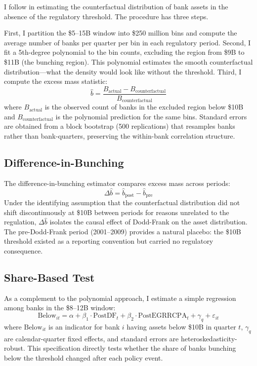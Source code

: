 \documentclass[12pt]{article}
\begin{document}
I follow \citet{Kleven2013} in estimating the counterfactual distribution of bank assets in the absence of the regulatory threshold. The procedure has three steps.

First, I partition the \$5--15B window into \$250 million bins and compute the average number of banks per quarter per bin in each regulatory period. Second, I fit a 5th-degree polynomial to the bin counts, excluding the region from \$9B to \$11B (the bunching region). This polynomial estimates the smooth counterfactual distribution---what the density would look like without the threshold. Third, I compute the excess mass statistic:
\begin{equation}
\hat{b} = \frac{B_{\text{actual}} - B_{\text{counterfactual}}}{B_{\text{counterfactual}}}
\label{eq:bunching}
\end{equation}
where $B_{\text{actual}}$ is the observed count of banks in the excluded region below \$10B and $B_{\text{counterfactual}}$ is the polynomial prediction for the same bins. Standard errors are obtained from a block bootstrap (500 replications) that resamples banks rather than bank-quarters, preserving the within-bank correlation structure.

\subsection{Difference-in-Bunching}

The difference-in-bunching estimator compares excess mass across periods:
\begin{equation}
\Delta \hat{b} = \hat{b}_{\text{post}} - \hat{b}_{\text{pre}}
\end{equation}
Under the identifying assumption that the counterfactual distribution did not shift discontinuously at \$10B between periods for reasons unrelated to the regulation, $\Delta \hat{b}$ isolates the causal effect of Dodd-Frank on the asset distribution. The pre-Dodd-Frank period (2001--2009) provides a natural placebo: the \$10B threshold existed as a reporting convention but carried no regulatory consequence.

\subsection{Share-Based Test}

As a complement to the polynomial approach, I estimate a simple regression among banks in the \$8--12B window:
\begin{equation}
\text{Below}_{it} = \alpha + \beta_1 \cdot \text{PostDF}_t + \beta_2 \cdot \text{PostEGRRCPA}_t + \gamma_q + \varepsilon_{it}
\label{eq:share}
\end{equation}
where $\text{Below}_{it}$ is an indicator for bank $i$ having assets below \$10B in quarter $t$, $\gamma_q$ are calendar-quarter fixed effects, and standard errors are heteroskedasticity-robust. This specification directly tests whether the share of banks bunching below the threshold changed after each policy event.
\end{document}
